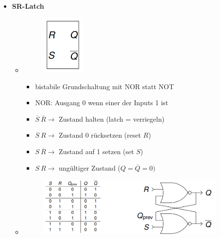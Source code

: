 \documentclass[11pt,a4paper]{article}
\begin{document}
\begin{itemize}
\item \textbf{SR-Latch}
	\begin{itemize}
	\item[]		
				\begin{minipage}{0.25\textwidth}
					\begin{figure}[H]
					\includegraphics[height=3cm]{srlatch1}
					\end{figure}
				\end{minipage}
				\begin{minipage}[t]{0.6\textwidth}
					\vspace{-1.25cm}
					\begin{itemize}
					\item bistabile Grundschaltung mit NOR statt NOT
					\item NOR: Ausgang 0 wenn einer der Inputs 1 ist
					\item $\overline{S}~\overline{R} \rightarrow$ Zustand halten (latch = verriegeln)
					\item $\overline{S}~R \rightarrow$ Zustand 0 rücksetzen (reset $R$)
					\item $S~\overline{R} \rightarrow$ Zustand auf 1 setzen (set $S$)
					\item $S~R \rightarrow$ ungültiger Zustand ($Q=\overline{Q}=0)$
					\end{itemize}
				\end{minipage}
				
	\item[] \begin{figure}[H]
				\begin{center}
				\includegraphics[height=3cm]{srlatch2}
				\end{center}
			\end{figure}
	\end{itemize}
	

\end{itemize}
\end{document}
